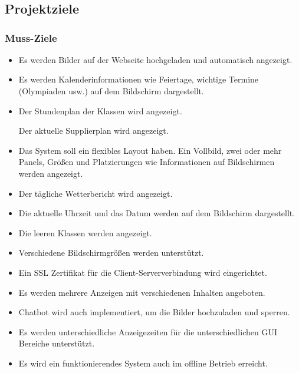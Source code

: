 \chapter{\docname}
\label{\docname}

\section{Projektziele}
\subsection{Muss-Ziele}

\begin{itemize}
	
	
	\item Es werden Bilder auf der Webseite hochgeladen und automatisch angezeigt.  
	
	\item Es werden Kalenderinformationen wie Feiertage, wichtige Termine (Olympiaden usw.) auf dem Bildschirm dargestellt.  
	
	\item Der Stundenplan der Klassen wird angezeigt.   
	
	Der aktuelle Supplierplan wird angezeigt.   
	
	\item Das System soll ein flexibles Layout haben. Ein Vollbild, zwei oder mehr Panels, Gr\"{o}\ss{}en und Platzierungen wie Informationen auf Bildschirmen werden angezeigt.  
	
	\item Der t\"{a}gliche Wetterbericht wird angezeigt.   
	
	\item Die aktuelle Uhrzeit und das Datum werden auf dem Bildschirm dargestellt.   
	
	\item Die leeren Klassen werden angezeigt.   
	
	\item Verschiedene Bildschirmgr\"{o}\ss{}en werden unterst\"{u}tzt.  
	
	\item Ein SSL Zertifikat f\"{u}r die Client-Serververbindung wird eingerichtet.   
	
	\item Es werden mehrere Anzeigen mit verschiedenen Inhalten angeboten.  
	
	\item Chatbot wird auch implementiert, um die Bilder hochzuladen und sperren.  
	
	\item Es werden unterschiedliche Anzeigezeiten f\"{u}r die unterschiedlichen GUI Bereiche unterst\"{u}tzt.  
	
	\item Es wird ein funktionierendes System auch im offline Betrieb erreicht. 
	
\end{itemize}

